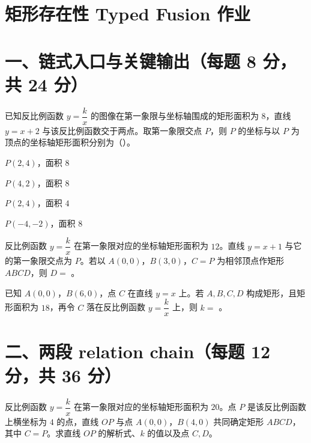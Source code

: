 \documentclass{exam-zh}
\newcommand{\answerarea}[1][40mm]{%
  \vspace{2mm}%
  \begin{tcolorbox}[
    enhanced, breakable,
    colback=white,
    colframe=white,
    boxrule=0pt,
    height=#1,
    valign=top,
    bottom=0mm,
    after skip=0mm,
  ]
  \end{tcolorbox}%
}
\begin{document}
\section*{矩形存在性 Typed Fusion 作业}

\section*{一、链式入口与关键输出（每题 8 分，共 24 分）}


\begin{question}[points=8]
  已知反比例函数 $y=\dfrac{k}{x}$ 的图像在第一象限与坐标轴围成的矩形面积为 $8$，直线 $y=x+2$ 与该反比例函数交于两点。取第一象限交点 $P$，则 $P$ 的坐标与以 $P$ 为顶点的坐标轴矩形面积分别为（\quad）。

  \begin{choices}
    \item $P(2,4)$，面积 $8$
    \item $P(4,2)$，面积 $8$
    \item $P(2,4)$，面积 $4$
    \item $P(-4,-2)$，面积 $8$
  \end{choices}
\end{question}



\begin{question}[points=8]
  反比例函数 $y=\dfrac{k}{x}$ 在第一象限对应的坐标轴矩形面积为 $12$。直线 $y=x+1$ 与它的第一象限交点为 $P$。若以 $A(0,0)$，$B(3,0)$，$C=P$ 为相邻顶点作矩形 $ABCD$，则 $D=$ \underline{\hspace{2cm}}。

\end{question}



\begin{question}[points=8]
  已知 $A(0,0)$，$B(6,0)$，点 $C$ 在直线 $y=x$ 上。若 $A,B,C,D$ 构成矩形，且矩形面积为 $18$，再令 $C$ 落在反比例函数 $y=\dfrac{k}{x}$ 上，则 $k=$ \underline{\hspace{2cm}}。

\end{question}


\section*{二、两段 relation chain（每题 12 分，共 36 分）}


\begin{problem}[points=12]
  反比例函数 $y=\dfrac{k}{x}$ 在第一象限对应的坐标轴矩形面积为 $20$。点 $P$ 是该反比例函数上横坐标为 $4$ 的点，直线 $OP$ 与点 $A(0,0)$，$B(4,0)$ 共同确定矩形 $ABCD$，其中 $C=P$。求直线 $OP$ 的解析式、$k$ 的值以及点 $C,D$。

  \answerarea[55mm]
\end{problem}
\end{document}
